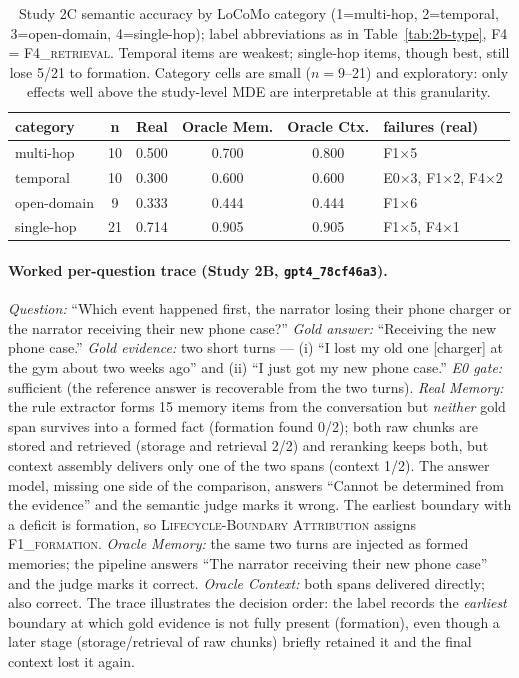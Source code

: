 \documentclass[11pt]{article}
\newcommand{\protocol}{\textsc{Lifecycle-Boundary Attribution}}
\newcommand{\fone}{F1\textsc{\_formation}}
\newcommand{\ffour}{F4\textsc{\_retrieval}}
\begin{document}
\begin{table}[!t]
\centering\footnotesize
\setlength{\tabcolsep}{5pt}
\begin{tabular}{lccccl}
\toprule
\textbf{category} & \textbf{n} & \textbf{Real} & \textbf{Oracle Mem.} & \textbf{Oracle Ctx.} & \textbf{failures (real)} \\
\midrule
multi-hop & 10 & 0.500 & 0.700 & 0.800 & F1$\times$5 \\
temporal & 10 & 0.300 & 0.600 & 0.600 & E0$\times$3, F1$\times$2, F4$\times$2 \\
open-domain & 9 & 0.333 & 0.444 & 0.444 & F1$\times$6 \\
single-hop & 21 & 0.714 & 0.905 & 0.905 & F1$\times$5, F4$\times$1 \\
\bottomrule
\end{tabular}
\caption{Study 2C semantic accuracy by LoCoMo category (1=multi-hop,
2=temporal, 3=open-domain, 4=single-hop); label abbreviations as in
Table~\ref{tab:2b-type}, F4 = \ffour{}. Temporal items are weakest;
single-hop items, though best, still lose 5/21 to formation. Category cells
are small ($n{=}9$--21) and exploratory: only effects well above the
study-level MDE are interpretable at this granularity.}
\label{tab:2c-type}
\end{table}

\paragraph{Worked per-question trace (Study 2B, \texttt{gpt4\_78cf46a3}).}
\emph{Question:} ``Which event happened first, the narrator losing their
phone charger or the narrator receiving their new phone case?''
\emph{Gold answer:} ``Receiving the new phone case.'' \emph{Gold
evidence:} two short turns --- (i) ``I lost my old one [charger] at the
gym about two weeks ago'' and (ii) ``I just got my new phone case.''
\emph{E0 gate:} sufficient (the reference answer is recoverable from the
two turns). \emph{Real Memory:} the rule extractor forms 15 memory items
from the conversation but \emph{neither} gold span survives into a formed
fact (formation found 0/2); both raw chunks are stored and retrieved
(storage and retrieval 2/2) and reranking keeps both, but context
assembly delivers only one of the two spans (context 1/2). The answer
model, missing one side of the comparison, answers ``Cannot be determined
from the evidence'' and the semantic judge marks it wrong. The earliest
boundary with a deficit is formation, so \protocol{} assigns
\fone{}. \emph{Oracle Memory:} the same two turns are injected as formed
memories; the pipeline answers ``The narrator receiving their new phone
case'' and the judge marks it correct. \emph{Oracle Context:} both spans
delivered directly; also correct. The trace illustrates the decision
order: the label records the \emph{earliest} boundary at which gold
evidence is not fully present (formation), even though a later stage
(storage/retrieval of raw chunks) briefly retained it and the final
context lost it again.
\end{document}
